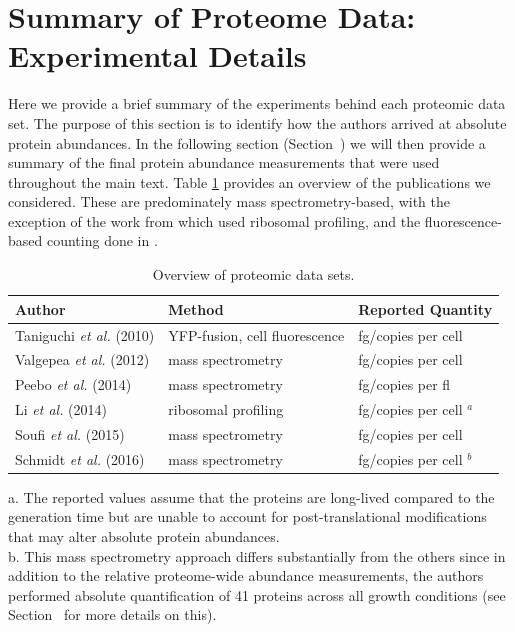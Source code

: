 \section{Summary of Proteome Data: Experimental Details}
\label{sec:SI_exp_summary}

Here we provide a brief summary of the experiments behind each proteomic data
set. The purpose of this section is to identify how the authors arrived at
absolute protein abundances. In the following section
(Section~) we will then provide a summary of the
final protein abundance measurements that were used throughout the main text.
Table \ref{tab:datasets} provides an overview of the publications we considered.
These are predominately mass spectrometry-based, with the exception of the work
from \cite{li2014} which used ribosomal profiling, and the fluorescence-based
counting done in \cite{taniguchi2010}.

\begin{table}[bt]
\caption{\label{tab:datasets}Overview of proteomic data sets.}
\begin{tabular}{l l l }
\toprule
Author & Method & Reported Quantity \\
\midrule
Taniguchi \textit{et al.} (2010)  & YFP-fusion, cell fluorescence    & fg/copies per cell      \\
Valgepea \textit{et al.} (2012)   & mass spectrometry                & fg/copies per cell      \\
Peebo \textit{et al.} (2014)      & mass spectrometry                & fg/copies per fl        \\
Li \textit{et al.} (2014)         & ribosomal profiling              & fg/copies per cell $^a$ \\
Soufi \textit{et al.} (2015)      & mass spectrometry                & fg/copies per cell      \\
Schmidt \textit{et al.} (2016)    & mass spectrometry                & fg/copies per cell $^b$ \\
\bottomrule
\end{tabular}

\medskip
a. The reported values assume that the proteins are long-lived compared to the
generation time but are unable to account for post-translational modifications
that may alter absolute protein abundances.
\\
b. This mass spectrometry approach differs substantially from the others since
in addition to the relative proteome-wide abundance measurements, the authors
performed absolute quantification of 41 proteins across all growth conditions
(see Section~ for more details on this).
\end{table}

